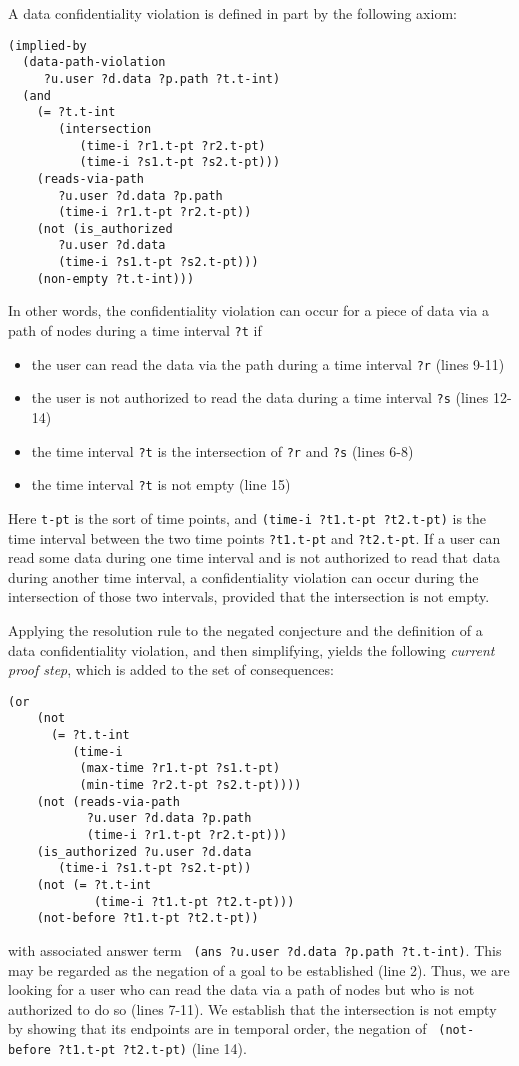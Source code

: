 A data confidentiality violation is defined in part by the following axiom:   
\begin{lstlisting}[]                                            
(implied-by
  (data-path-violation 
     ?u.user ?d.data ?p.path ?t.t-int)
  (and
    (= ?t.t-int
       (intersection
    	  (time-i ?r1.t-pt ?r2.t-pt)
    	  (time-i ?s1.t-pt ?s2.t-pt)))
    (reads-via-path
       ?u.user ?d.data ?p.path 
       (time-i ?r1.t-pt ?r2.t-pt))
    (not (is_authorized
       ?u.user ?d.data
       (time-i ?s1.t-pt ?s2.t-pt)))
    (non-empty ?t.t-int)))
\end{lstlisting}

In other words, the confidentiality violation can occur for a piece of data via a path of nodes during a time interval \verb'?t' if
\begin{itemize}
\item the user can read the data via the path during a time interval \verb'?r' (lines 9-11)
\item the user is not authorized to read the data during a time interval \verb'?s' (lines 12-14)
\item the time interval \verb'?t' is the intersection of \verb'?r' and \verb'?s' (lines 6-8)
\item the time interval \verb'?t' is not empty (line 15)
\end{itemize}

Here  \verb't-pt' is the sort of time points, and \verb'(time-i ?t1.t-pt ?t2.t-pt)' is the time interval between the two time points \verb'?t1.t-pt' and \verb'?t2.t-pt'. If a user can read some data during one time interval and is not authorized to read that data during another time interval, a confidentiality violation can occur during the intersection of those two intervals, provided that the intersection is not empty.

Applying the resolution rule to the negated conjecture and the definition of a data confidentiality violation, and then simplifying, yields the following \textit{current proof step}, which is added to the set of consequences:

\begin{lstlisting}[] 
   (or 
    (not 
      (= ?t.t-int
         (time-i 
          (max-time ?r1.t-pt ?s1.t-pt)
          (min-time ?r2.t-pt ?s2.t-pt))))
    (not (reads-via-path
           ?u.user ?d.data ?p.path
           (time-i ?r1.t-pt ?r2.t-pt)))
    (is_authorized ?u.user ?d.data
       (time-i ?s1.t-pt ?s2.t-pt))
    (not (= ?t.t-int
            (time-i ?t1.t-pt ?t2.t-pt)))
    (not-before ?t1.t-pt ?t2.t-pt))
\end{lstlisting}
with associated answer term \verb' (ans ?u.user ?d.data ?p.path ?t.t-int)'.
This may be regarded as the negation of a goal to be established (line 2).
Thus, we are looking for a user who can read the data via a path of nodes but who is not authorized to do so (lines 7-11).
We establish that the intersection is not empty by showing that its endpoints are in temporal order, \ie the negation of \verb' (not-before ?t1.t-pt ?t2.t-pt)' (line 14).

